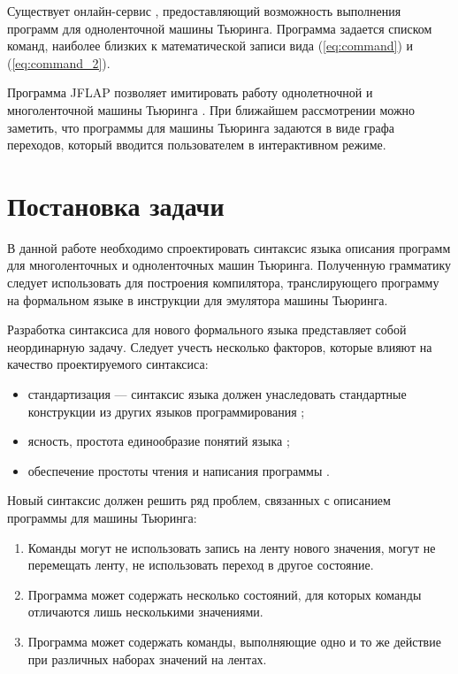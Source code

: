 \documentclass[10pt, normalheadings]{scrartcl}
\begin{document}
Существует онлайн-сервис \cite{Online_Turing}, предоставляющий возможность выполнения программ для одноленточной машины Тьюринга. Программа задается списком команд, наиболее близких к математической записи вида (\ref{eq:command}) и (\ref{eq:command_2}).

Программа JFLAP позволяет имитировать работу однолетночной и многоленточной машины Тьюринга \cite[с.~126]{Rodger_JFLAP}. При ближайшем рассмотрении можно заметить, что программы для машины Тьюринга задаются в виде графа переходов, который вводится пользователем в интерактивном режиме.

\section*{Постановка задачи}

В данной работе необходимо спроектировать синтаксис языка описания программ для многоленточных и одноленточных машин Тьюринга. Полученную грамматику следует использовать для построения компилятора, транслирующего программу на формальном языке в инструкции для эмулятора машины Тьюринга.

Разработка синтаксиса для нового формального языка представляет собой неординарную задачу. Следует учесть несколько факторов, которые влияют на качество проектируемого синтаксиса:
\begin{itemize}
	\item стандартизация --- синтаксис языка должен унаследовать стандартные конструкции из других языков программирования \cite[с.~48]{Pratt_Languages};
	\item ясность, простота единообразие понятий языка \cite[с.~38]{Pratt_Languages};
	\item обеспечение простоты чтения и написания программы \cite[c.~94]{Pratt_Languages}.
\end{itemize}

Новый синтаксис должен решить ряд проблем, связанных с описанием программы для машины Тьюринга:
\begin{enumerate}
	\item Команды могут не использовать запись на ленту нового значения, могут не перемещать ленту, не использовать переход в другое состояние.\label{item:task1}
	\item Программа может содержать несколько состояний, для которых команды отличаются лишь несколькими значениями.\label{item:task2}
	\item Программа может содержать команды, выполняющие одно и то же действие при различных наборах значений на лентах.\label{item:task3}
\end{enumerate}
\end{document}

